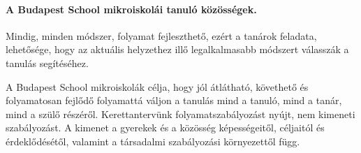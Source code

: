   \paragraph{A Budapest School mikroiskolái tanuló közösségek.} Mindig, minden módszer,
  folyamat fejleszthető, ezért a tanárok feladata, lehetősége, hogy az aktuális
  helyzethez illő legalkalmasabb módszert válasszák a tanulás segítéséhez.

  A Budapest School mikroiskolák célja, hogy jól átlátható, követhető és
  folyamatosan fejlődő folyamattá váljon a tanulás mind a tanuló, mind a tanár, mind
  a szülő részéről. Kerettantervünk folyamatszabályozást nyújt, nem kimeneti
  szabályozást. A kimenet a gyerekek és a közösség képességeitől, céljaitól és érdeklődésétől,
  valamint a társadalmi szabályozási környezettől függ.

\ifkerettanterv

\fi
